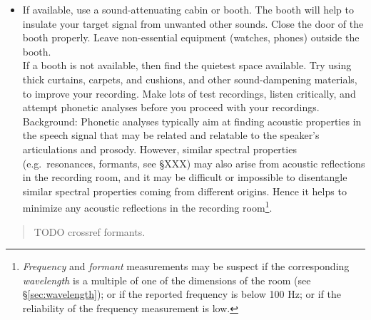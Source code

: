 \documentclass[
]{book}
\providecommand{\tightlist}{%
  \setlength{\itemsep}{0pt}\setlength{\parskip}{0pt}}
\begin{document}
\begin{itemize}
\tightlist
\item
  If available, use a sound-attenuating cabin or booth. The booth will help to insulate your target signal from unwanted other sounds. Close the door of the booth properly. Leave non-essential equipment (watches, phones) outside the booth.\\
  If a booth is not available, then find the quietest space available. Try using thick curtains, carpets, and cushions, and other sound-dampening materials, to improve your recording. Make lots of test recordings, listen critically, and attempt phonetic analyses before you proceed with your recordings.\\
  Background: Phonetic analyses typically aim at finding acoustic properties in the speech signal that may be related and relatable to the speaker's articulations and prosody. However, similar spectral properties (e.g.~resonances, formants, see §XXX) may also arise from acoustic reflections in the recording room, and it may be difficult or impossible to disentangle similar spectral properties coming from different origins. Hence it helps to minimize any acoustic reflections in the recording room\footnote{\emph{Frequency} and \emph{formant} measurements may be suspect if the corresponding \emph{wavelength} is a multiple of one of the dimensions of the room (see §\ref{sec:wavelength}); or if the reported frequency is below 100 Hz; or if the reliability of the frequency measurement is low.}.
\end{itemize}

\begin{quote}
TODO crossref formants.
\end{quote}
\end{document}
